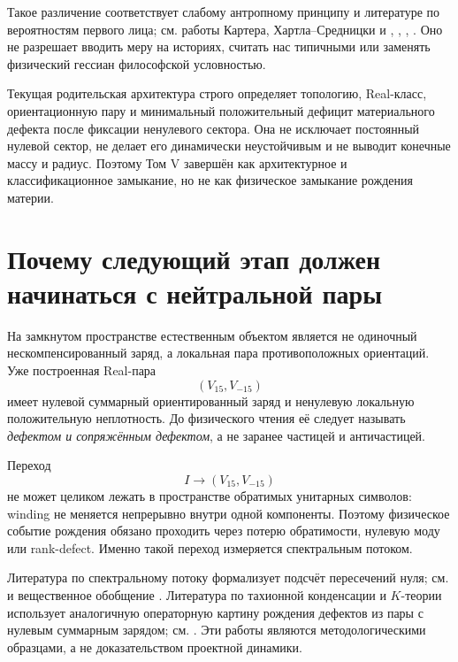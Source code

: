 Такое различение соответствует слабому антропному принципу и литературе
по вероятностям первого лица; см. работы Картера, Хартла--Средницки и
, ,
, . Оно не разрешает
вводить меру на историях, считать нас типичными или заменять физический
гессиан философской условностью.

\begin{theorem}
Текущая родительская архитектура строго определяет топологию, Real-класс,
ориентационную пару и минимальный положительный дефицит материального
дефекта после фиксации ненулевого сектора. Она не исключает постоянный
нулевой сектор, не делает его динамически неустойчивым и не выводит
конечные массу и радиус. Поэтому Том V завершён как архитектурное и
классификационное замыкание, но не как физическое замыкание рождения
материи.
\end{theorem}

\section{Почему следующий этап должен начинаться с нейтральной пары}

На замкнутом пространстве естественным объектом является не одиночный
нескомпенсированный заряд, а локальная пара противоположных ориентаций.
Уже построенная Real-пара
\begin{equation}
 (V_{15},V_{-15})
\end{equation}
имеет нулевой суммарный ориентированный заряд и ненулевую локальную
положительную неплотность. До физического чтения её следует называть
\emph{дефектом и сопряжённым дефектом}, а не заранее частицей и
античастицей.

Переход
\begin{equation}
 I\longrightarrow(V_{15},V_{-15})
 \label{eq:v5-final-zero-to-real-pair}
\end{equation}
не может целиком лежать в пространстве обратимых унитарных символов:
winding не меняется непрерывно внутри одной компоненты. Поэтому физическое
событие рождения обязано проходить через потерю обратимости, нулевую моду
или rank-defect. Именно такой переход измеряется спектральным потоком.

Литература по спектральному потоку формализует подсчёт пересечений нуля;
см.  и вещественное обобщение
. Литература по тахионной конденсации и
$K$-теории использует аналогичную операторную картину рождения
дефектов из пары с нулевым суммарным зарядом; см.
. Эти работы являются методологическими
образцами, а не доказательством проектной динамики.

